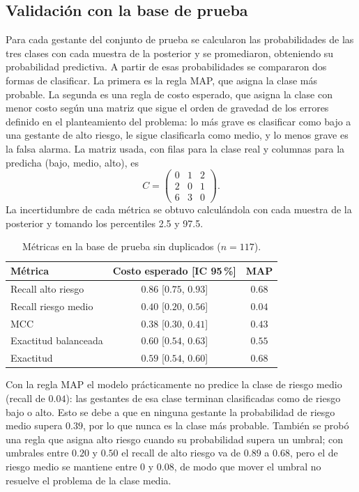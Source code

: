 \subsection{Validación con la base de prueba}
Para cada gestante del conjunto de prueba se calcularon las probabilidades de
las tres clases con cada muestra de la posterior y se promediaron, obteniendo
su probabilidad predictiva. A partir de esas probabilidades se compararon dos
formas de clasificar. La primera es la regla MAP, que asigna la clase más
probable. La segunda es una regla de costo esperado, que asigna la clase con
menor costo según una matriz que sigue el orden de gravedad de los errores
definido en el planteamiento del problema: lo más grave es clasificar como bajo
a una gestante de alto riesgo, le sigue clasificarla como medio, y lo menos
grave es la falsa alarma. La matriz usada, con filas para la clase real y
columnas para la predicha (bajo, medio, alto), es
\[
C=\begin{pmatrix}0&1&2\\2&0&1\\6&3&0\end{pmatrix}.
\]
La incertidumbre de cada métrica se obtuvo calculándola con cada muestra de la
posterior y tomando los percentiles 2.5 y 97.5.

\begin{table}[h]
\centering
\caption{Métricas en la base de prueba sin duplicados ($n=117$).}
\label{tab:metricas}
\small
\begin{tabular}{lcc}
\toprule
Métrica & Costo esperado [IC 95\,\%] & MAP\\
\midrule
Recall alto riesgo  & $0.86$ [$0.75$, $0.93$] & $0.68$\\
Recall riesgo medio & $0.40$ [$0.20$, $0.56$] & $0.04$\\
MCC                 & $0.38$ [$0.30$, $0.41$] & $0.43$\\
Exactitud balanceada& $0.60$ [$0.54$, $0.63$] & $0.55$\\
Exactitud           & $0.59$ [$0.54$, $0.60$] & $0.68$\\
\bottomrule
\end{tabular}
\end{table}

Con la regla MAP el modelo prácticamente no predice la clase de riesgo medio
(recall de $0.04$): las gestantes de esa clase terminan clasificadas como de
riesgo bajo o alto. Esto se debe a que en ninguna gestante la probabilidad de
riesgo medio supera $0.39$, por lo que nunca es la clase más probable. También
se probó una regla que asigna alto riesgo cuando su probabilidad supera un
umbral; con umbrales entre $0.20$ y $0.50$ el recall de alto riesgo va de $0.89$
a $0.68$, pero el de riesgo medio se mantiene entre $0$ y $0.08$, de modo que
mover el umbral no resuelve el problema de la clase media.

